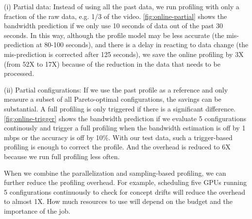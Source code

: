 (i) Partial data: Instead of using all the past data, we run profiling with only
a fraction of the raw data, e.g. 1/3 of the video.  \autoref{fig:online-partial}
shows the bandwidth prediction if we only use 10 seconds of data out of the past
30 seconds. In this way, although the profile model may be less accurate (the
mis-prediction at 80-100 seconds), and there is a delay in reacting to data
change (the mis-prediction is corrected after 125 seconds), we save the online
profiling by 3X (from 52X to 17X) because of the reduction in the data that
needs to be processed.

(ii) Partial configurations: If we use the past profile as a reference and only
measure a subset of all Pareto-optimal configurations, the savings can be
substantial. A full profiling is only triggered if there is a significant
difference. \autoref{fig:online-trigger} shows the bandwidth prediction if we
evaluate 5 configurations continously and trigger a full profiling when the
bandwidth estimation is off by 1 mbps or the accuracy is off by 10\%. With our
test data, such a trigger-based profiling is enough to correct the profile.  And
the overhead is reduced to 6X because we run full profiling less often.

When we combine the parallelization and sampling-based profiling, we can further
reduce the profiling overhead. For example, scheduling five GPUs running 5
configurations continuously to check for concept drifts will reduce the overhead
to almost 1X. How much resources to use will depend on the budget and the
importance of the job.

